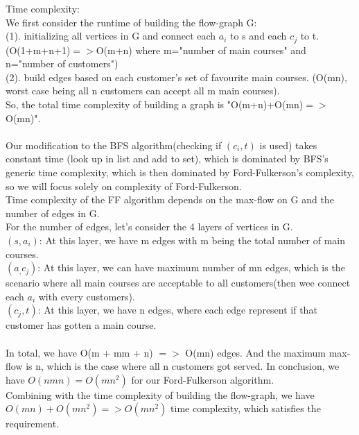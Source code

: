 \documentclass{assignment-373}
\begin{document}
\begin{enumerate}
    Time complexity:\\
    \phantom{=} \phantom{=} We first consider the runtime of building the flow-graph G:\\
    \phantom{=} \phantom{=}\phantom{=} (1). initializing all vertices in G and connect each $a_i$ to s and each $c_j$ to t. (O(1+m+n+1)$=>$O(m+n) where m="number of main courses" and n="number of customers")\\
    \phantom{=} \phantom{=}\phantom{=} (2). build edges based on each customer's set of favourite main courses. (O(mn), worst case being all n customers can accept all m main courses).\\
    \phantom{=} \phantom{=} So, the total time complexity of building a graph is "O(m+n)+O(mn)$=>$O(mn)".\\
    \\
    \phantom{=} \phantom{=}Our modification to the BFS algorithm(checking if $(c_i, t)$ is used) takes constant time (look up in list and add to set), which is dominated by BFS's generic time complexity, which is then dominated by Ford-Fulkerson's complexity, so we will focus solely on complexity of Ford-Fulkerson.\\
    Time complexity of the FF algorithm depends on the max-flow on G and the number of edges in G. \\
    \phantom{=} \phantom{=}For the number of edges, let's consider the 4 layers of vertices in G.\\
    \phantom{=} \phantom{=}\phantom{=} $(s,a_i)$:   At this layer, we have m edges with m being the total number of main courses.\\
    \phantom{=} \phantom{=}\phantom{=} $(a_,c_j)$: At this layer, we can have maximum number of mn edges, which is the scenario where all main courses are acceptable to all customers(then wee connect each $a_i$ with every customers).\\
    \phantom{=} \phantom{=}\phantom{=} $(c_j,t)$: At this layer, we have n edges, where each edge represent if that customer has gotten a main course.\\
    \\
    In total, we have O(m + mm + n) $= >$ O(mn) edges. And the maximum max-flow is n, which is the case where all n customers got served. In conclusion, we have $O(nmn) = O(mn^2)$ for our Ford-Fulkerson algorithm.\\
    
    Combining with the time complexity of building the flow-graph, we have $O(mn)+O(mn^2)=>O(mn^2)$ time complexity, which satisfies the requirement.\\
    

\end{enumerate}
\end{document}
